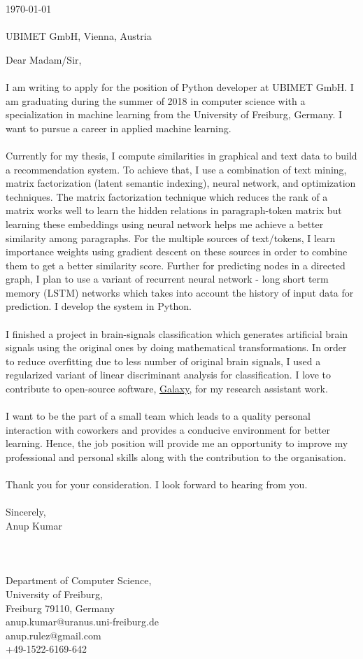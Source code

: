 \documentclass[a4paper]{article}
\begin{document}
\today \\
\\
UBIMET GmbH, \newline
Vienna, \newline
Austria \newline

Dear Madam/Sir,
\\
\\
I am writing to apply for the position of Python developer at UBIMET GmbH. I am graduating during the summer of 2018 in computer science with a specialization in machine learning from the University of Freiburg, Germany. I want to pursue a career in applied machine learning.
\\
\\
Currently for my thesis, I compute similarities in graphical and text data to build a recommendation system. To achieve that, I use a combination of text mining, matrix factorization (latent semantic indexing), neural network, and optimization techniques. The matrix factorization technique which reduces the rank of a matrix works well to learn the hidden relations in paragraph-token matrix but learning these embeddings using neural network helps me achieve a better similarity among paragraphs. For the multiple sources of text/tokens, I learn importance weights using gradient descent on these sources in order to combine them to get a better similarity score. Further for predicting nodes in a directed graph, I plan to use a variant of recurrent neural network - long short term memory (LSTM) networks which takes into account the history of input data for prediction. I develop the system in Python.
\\
\\
I finished a project in brain-signals classification which generates artificial brain signals using the original ones by doing mathematical transformations. In order to reduce overfitting due to less number of original brain signals, I used a regularized variant of linear discriminant analysis for classification. I love to contribute to open-source software, 
\href{https://usegalaxy.org/} {Galaxy}, for my research assistant work.
\\
\\
I want to be the part of a small team which leads to a quality personal interaction with coworkers and provides a conducive environment for better learning. Hence, the job position will provide me an opportunity to improve my professional and personal skills along with the contribution to the organisation.
\\
\\
Thank you for your consideration. I look forward to hearing from you.
\\
\\
Sincerely, \\
Anup Kumar \newline
\\
\\
\\
\\
Department of Computer Science, \\
University of Freiburg, \\
Freiburg 79110, Germany \\
anup.kumar@uranus.uni-freiburg.de\\
anup.rulez@gmail.com\\
+49-1522-6169-642\\
\end{document}
